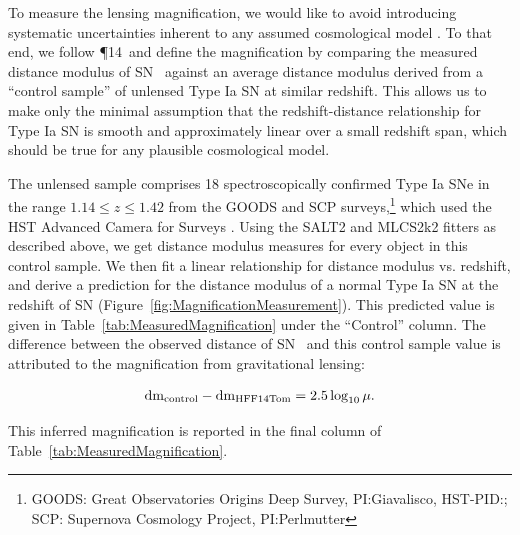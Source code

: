 To measure the lensing magnification, we would like to avoid
introducing systematic uncertainties inherent to any assumed
cosmological model \citep[e.g.][]{Nordin:2014}.  To that end, we
follow \P14\ and define the magnification by comparing
the measured distance modulus of SN \tomas\ against an average
distance modulus derived from a ``control sample'' of unlensed Type Ia
SN at similar redshift.  This allows us to make only the minimal
assumption that the redshift-distance relationship for Type Ia SN is
smooth and approximately linear over a small redshift span, which
should be true for any plausible cosmological model.

The unlensed sample comprises 18 spectroscopically confirmed Type Ia
SNe in the range $1.14\leq z \leq1.42$ from the GOODS and SCP
surveys,\footnote{GOODS: Great Observatories Origins Deep Survey,
PI:Giavalisco, HST-PID:; SCP: Supernova Cosmology Project,
PI:Perlmutter} which used the HST Advanced Camera for
Surveys \citep{Riess:2006,Suzuki:2012}.  Using the SALT2 and MLCS2k2
fitters as described above, we get distance modulus measures for every
object in this control sample.  We then fit a linear relationship for
distance modulus vs. redshift, and derive a prediction for the
distance modulus of a normal Type Ia SN at the redshift of SN \tomas
(Figure~\ref{fig:MagnificationMeasurement}).
This predicted value is given in
Table~\ref{tab:MeasuredMagnification} under the ``Control'' column.
The difference between the observed distance of SN \tomas\ and this
control sample value is attributed to the magnification from
gravitational lensing:

\begin{equation} \label{eqn:mu}
{\rm dm}_{\rm control} - {\rm dm}_{\rm HFF14Tom} = 2.5 \log_{10}\mu.
\end{equation}

\noindent This inferred magnification is reported in the final column of
Table~\ref{tab:MeasuredMagnification}.

